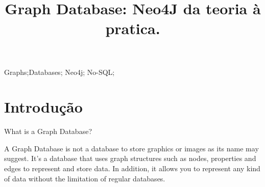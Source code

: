 \documentclass[10pt, conference, compsocconf]{IEEEtran}
\begin{document}
\title{Graph Database: Neo4J da teoria à pratica. }

\author{
\and
{}
\and
{}
\and
{}
}

\maketitle

\begin{abstract}



\end{abstract}

\begin{IEEEkeywords}
Graphs;Databases; Neo4j; No-SQL;

\end{IEEEkeywords}

\IEEEpeerreviewmaketitle

\section{Introdução}\label{sec:intro}


What is a Graph Database?

A Graph Database is not a database to store graphics or images as its name may suggest. It’s a database that uses graph structures such as nodes, properties and edges to represent and store data. In addition, it allows you to represent any kind of data without the limitation of regular databases.
\end{document}
